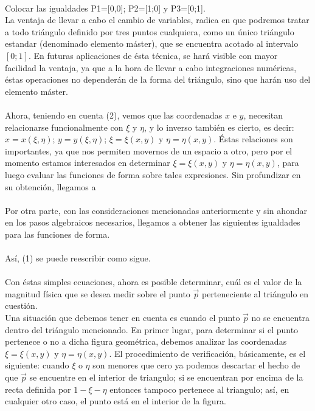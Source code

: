 \\
Colocar las igualdades P1=[0,0]; P2=[1;0] y P3=[0;1].
\\
La ventaja de llevar a cabo el cambio de variables, radica en que podremos tratar a todo triángulo definido por tres puntos cualquiera, como un único triángulo estandar (denominado elemento máster), que se encuentra acotado al intervalo $ [0; 1] $. En futuras aplicaciones de ésta técnica, se hará visible con mayor facilidad la ventaja, ya que a la hora de llevar a cabo integraciones numéricas, éstas operaciones no dependerán de la forma del triángulo, sino que harán uso del elemento máster. 
\\
\\
Ahora, teniendo en cuenta (2), vemos que las coordenadas $x$ e $y$, necesitan relacionarse funcionalmente con  $\xi$ y $\eta$, y lo inverso también es cierto, es decir: $x=x( \xi, \eta)$; $y=y( \xi, \eta)$; $\xi= \xi(x,y)$ y $\eta= \eta(x,y)$. Éstas relaciones son importantes, ya que nos permiten movernos de un espacio a otro, pero por el momento estamos interesados en determinar $\xi= \xi(x,y)$ y $\eta= \eta(x,y)$, para luego evaluar las funciones de forma sobre tales expresiones. Sin profundizar en su obtención, llegamos a
\\ 
\\
Por otra parte, con las consideraciones mencionadas anteriormente y sin ahondar en los pasos algebraicos necesarios, llegamos a obtener las siguientes igualdades para las funciones de forma.
\\
\\
Así, (1) se puede reescribir como sigue.
\\
\\

Con éstas simples ecuaciones, ahora es posible determinar, cuál es el valor de la magnitud física que se desea medir sobre el punto $\vec{p}$ perteneciente al triángulo en cuestión.
\\
Una situación que debemos tener en cuenta es cuando el punto $\vec{p}$ no se encuentra dentro del triángulo mencionado. En primer lugar, para determinar si el punto pertenece o no a dicha figura geométrica, debemos analizar las coordenadas $\xi= \xi(x,y)$ y $\eta= \eta(x,y)$. El procedimiento de verificación, básicamente, es el siguiente: cuando $\xi$ o $\eta$ son menores que cero ya podemos descartar el hecho de que $\vec{p}$ se encuentre en el interior de triangulo; si se encuentran por encima de la recta definida por $1-\xi-\eta$ entonces tampoco pertenece al triangulo; así, en cualquier otro caso, el punto está en el interior de la figura. 



